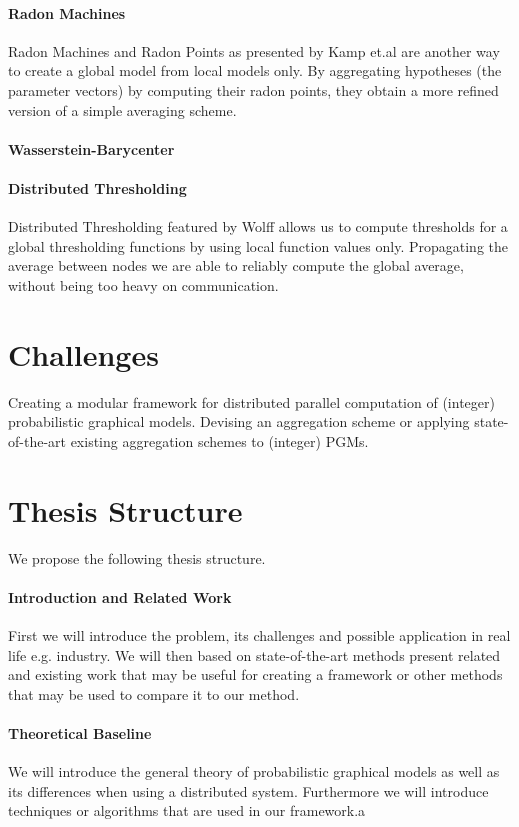     \paragraph{Radon Machines}
    Radon Machines and Radon Points as presented by Kamp et.al \cite{kamp2017effective} are another way to create a global model from local models only. By aggregating hypotheses (the parameter vectors) by computing their radon points, they obtain a more refined version of a simple averaging scheme.

    \paragraph{Wasserstein-Barycenter}

    \paragraph{Distributed Thresholding} 
    Distributed Thresholding featured by Wolff \cite{wolff2013local} allows us to compute thresholds for a global thresholding functions by using local function values only. Propagating the average between nodes we are able to reliably compute the global average, without being too heavy on communication.
    \section{Challenges}
   Creating a modular framework for distributed parallel computation of (integer) probabilistic graphical models. 
   Devising an aggregation scheme or applying state-of-the-art existing aggregation schemes to (integer) PGMs.

    \section{Thesis Structure}
    We propose the following thesis structure.
    
    \paragraph{Introduction and Related Work}
    First we will introduce the problem, its challenges and possible application in real life e.g. industry. We will then based on state-of-the-art methods present related and existing work that may be useful for creating a framework or other methods that may be used to compare it to our method.

    \paragraph{Theoretical Baseline}
    We will introduce the general theory of probabilistic graphical models as well as its differences when using a distributed system. Furthermore we will introduce techniques or algorithms that are used in our framework.a

